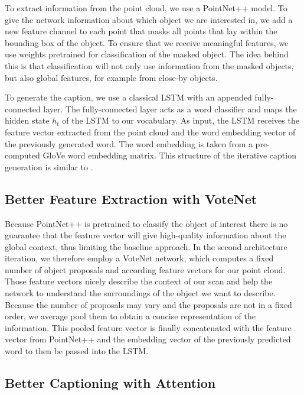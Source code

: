 \documentclass[10pt,twocolumn,letterpaper]{article}
\begin{document}
To extract information from the point cloud, we use a PointNet++ \cite{qi2017pointnet++} model. To give the network information about which object we are interested in, we add a new feature channel to each point that masks all points that lay within the bounding box of the object. To ensure that we receive meaningful features, we use weights pretrained for classification of the masked object. The idea behind this is that classification will not only use information from the masked objects, but also global features, for example from close-by objects. 

To generate the caption, we use a classical LSTM with an appended fully-connected layer. The fully-connected layer acts as a word classifier and maps the hidden state $h_{t}$ of the LSTM to our vocabulary. As input, the LSTM receives the feature vector extracted from the point cloud and the word embedding vector of the previously generated word. The word embedding is taken from a pre-computed GloVe \cite{pennington2014glove} word embedding matrix. This structure of the iterative caption generation is similar to \cite{xu2015show}.

\subsection{Better Feature Extraction with VoteNet}

Because PointNet++ is pretrained to classify the object of interest there is no guarantee that the feature vector will give high-quality information about the global context, thus limiting the baseline approach. In the second architecture iteration, we therefore employ a VoteNet \cite{qi2019deep} network, which computes a fixed number of object proposals and according feature vectors for our point cloud. Those feature vectors nicely describe the context of our scan and help the network to understand the surroundings of the object we want to describe. Because the number of proposals may vary and the proposals are not in a fixed order, we average pool them to obtain a concise representation of the information. This pooled feature vector is finally concatenated with the feature vector from PointNet++ and the embedding vector of the previously predicted word to then be passed into the LSTM.

\subsection{Better Captioning with Attention}
\end{document}
